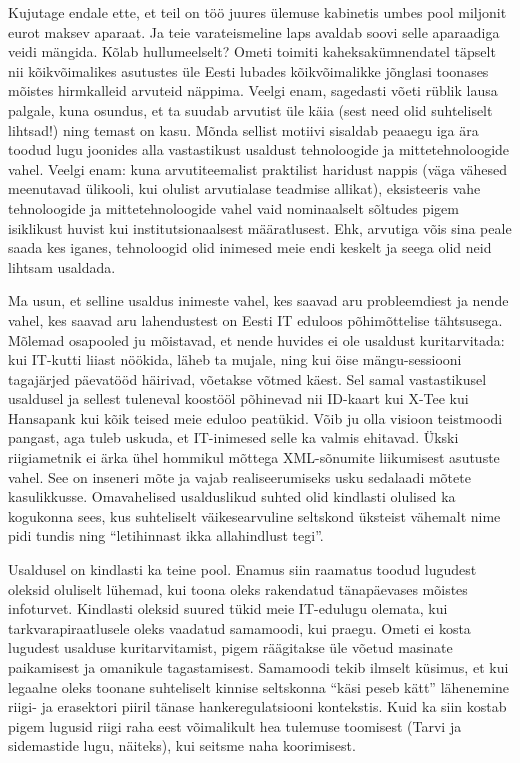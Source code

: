 Kujutage endale ette, et teil on töö juures ülemuse kabinetis umbes pool 
miljonit eurot maksev aparaat. Ja teie varateismeline laps avaldab soovi selle 
aparaadiga veidi mängida. Kõlab hullumeelselt? Ometi toimiti kaheksakümnendatel 
täpselt nii kõikvõimalikes asutustes üle Eesti lubades kõikvõimalikke jõnglasi 
toonases mõistes hirmkalleid arvuteid näppima. Veelgi enam, sagedasti võeti 
rüblik lausa palgale, kuna osundus, et ta suudab arvutist üle käia (sest need 
olid suhteliselt lihtsad!) ning temast on kasu. Mõnda sellist motiivi sisaldab 
peaaegu iga ära toodud lugu joonides alla vastastikust usaldust tehnoloogide ja 
mittetehnoloogide vahel. Veelgi enam: kuna arvutiteemalist praktilist haridust 
nappis (väga vähesed meenutavad ülikooli, kui olulist arvutialase teadmise 
allikat), eksisteeris vahe  tehnoloogide ja mittetehnoloogide vahel vaid 
nominaalselt sõltudes pigem isiklikust huvist kui  institutsionaalsest 
määratlusest. Ehk, arvutiga võis sina peale saada kes iganes, tehnoloogid olid 
inimesed meie endi keskelt ja seega olid neid lihtsam usaldada.

Ma usun, et selline usaldus inimeste vahel, kes saavad aru probleemdiest ja 
nende vahel, kes saavad aru lahendustest on Eesti IT eduloos põhimõttelise 
tähtsusega. Mõlemad osapooled ju mõistavad, et nende huvides ei ole usaldust 
kuritarvitada: kui IT-kutti liiast nöökida, läheb ta mujale, ning kui öise 
mängu-sessiooni tagajärjed päevatööd häirivad, võetakse võtmed käest. Sel samal 
vastastikusel usaldusel ja sellest tuleneval koostööl põhinevad nii ID-kaart 
kui X-Tee kui Hansapank kui kõik teised meie eduloo peatükid. Võib ju olla 
visioon teistmoodi pangast, aga tuleb uskuda, et IT-inimesed selle ka valmis 
ehitavad. Ükski riigiametnik ei ärka ühel hommikul mõttega XML-sõnumite 
liikumisest asutuste vahel. See on inseneri mõte ja vajab realiseerumiseks usku 
sedalaadi mõtete kasulikkusse. Omavahelised usalduslikud suhted olid kindlasti 
olulised ka kogukonna sees, kus suhteliselt väikesearvuline seltskond üksteist 
vähemalt nime pidi tundis ning \enquote{letihinnast ikka allahindlust tegi}. 

Usaldusel on kindlasti ka teine pool. Enamus siin raamatus toodud lugudest 
oleksid oluliselt lühemad, kui toona oleks rakendatud tänapäevases mõistes 
infoturvet. Kindlasti oleksid suured tükid meie IT-edulugu olemata, kui 
tarkvarapiraatlusele oleks vaadatud samamoodi, kui praegu. Ometi ei kosta 
lugudest usalduse kuritarvitamist, pigem räägitakse üle võetud masinate 
paikamisest ja omanikule tagastamisest. Samamoodi tekib ilmselt küsimus, et kui 
legaalne oleks toonane suhteliselt kinnise seltskonna \enquote{käsi peseb kätt} 
lähenemine riigi- ja erasektori piiril tänase hankeregulatsiooni kontekstis. 
Kuid ka siin kostab pigem lugusid riigi raha eest võimalikult hea tulemuse 
toomisest (Tarvi ja sidemastide lugu, näiteks), kui seitsme naha koorimisest. 

